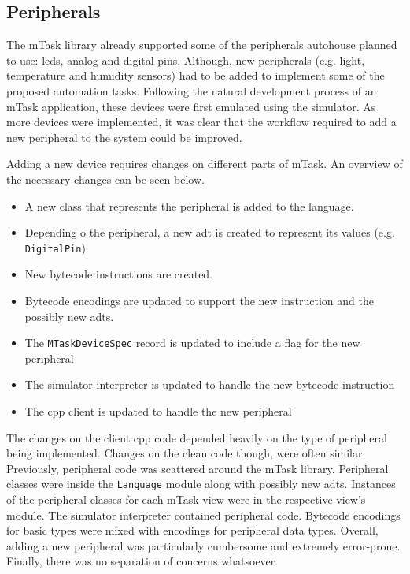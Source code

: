 \subsection{Peripherals}

The \gls{mTask} library already supported some of the peripherals \gls{autohouse} planned to use: \acsp{led}, analog and digital pins. Although, new peripherals (e.g. light, temperature and humidity sensors) had to be added to implement some of the proposed automation tasks. Following the natural development process of an \gls{mTask} application, these devices were first emulated using the simulator. As more devices were implemented, it was clear that the workflow required to add a new peripheral to the system could be improved.

Adding a new device requires changes on different parts of \gls{mTask}. An overview of the necessary changes can be seen below.

\begin{itemize}
    \item A new class that represents the peripheral is added to the language. 
    \item Depending o the peripheral, a new \ac{adt} is created to represent its values (e.g. \texttt{DigitalPin}).
    \item New bytecode instructions are created.
    \item Bytecode encodings are updated to support the new instruction and the possibly new \acsp{adt}.
    \item The \texttt{MTaskDeviceSpec} record is updated to include a flag for the new peripheral
    \item The simulator interpreter is updated to handle the new bytecode instruction
    \item The \gls{cpp} client is updated to handle the new peripheral
\end{itemize}

The changes on the client \gls{cpp} code depended heavily on the type of peripheral being implemented. Changes on the \gls{clean} code though, were often similar. Previously, peripheral code was scattered around the \gls{mTask} library. Peripheral classes were inside the \texttt{Language} module along with possibly new \acsp{adt}. Instances of the peripheral classes for each \gls{mTask} view were in the respective view's module. The simulator interpreter contained peripheral code. Bytecode encodings for basic types were mixed with encodings for peripheral data types. Overall, adding a new peripheral was particularly cumbersome and extremely error-prone. Finally, there was no separation of concerns whatsoever.

